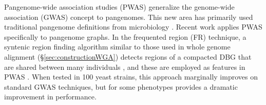 Pangenome-wide association studies (PWAS) generalize the genome-wide association (GWAS) concept to pangenomes.
This new area has primarily used traditional pangenome definitions from microbiology \cite{Brynildsrud_2016}.
Recent work applies PWAS specifically to pangenome graphs.
In the frequented region (FR) technique, a syntenic region finding algorithm similar to those used in whole genome alignment (\S \ref{sec:constructionWGA}) detects regions of a compacted DBG that are shared between many individuals \cite{cleary2018exploring}, and these are employed as features in PWAS \cite{Manuweera_2019}.
When tested in 100 yeast strains, this approach marginally improves on standard GWAS techniques, but for some phenotypes provides a dramatic improvement in performance. %





